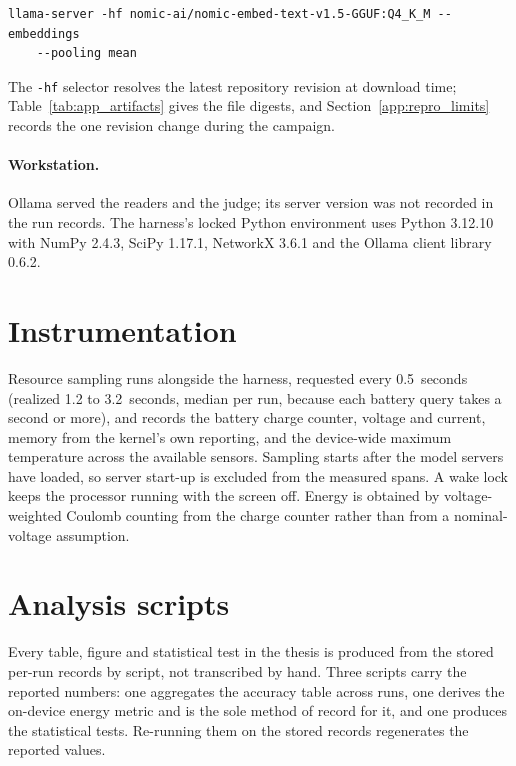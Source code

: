\begin{small}
\begin{verbatim}
llama-server -hf nomic-ai/nomic-embed-text-v1.5-GGUF:Q4_K_M --embeddings
    --pooling mean
\end{verbatim}
\end{small}

The \texttt{-hf} selector resolves the latest repository revision at download time;
Table~\ref{tab:app_artifacts} gives the file digests, and Section~\ref{app:repro_limits} records the
one revision change during the campaign.

\paragraph{Workstation.} Ollama served the readers and the judge; its server version was not
recorded in the run records. The harness's locked Python environment uses Python 3.12.10 with
NumPy 2.4.3, SciPy 1.17.1, NetworkX 3.6.1 and the Ollama client library 0.6.2.

\section{Instrumentation}
\label{app:repro_instrumentation}

Resource sampling runs alongside the harness, requested every 0.5~seconds (realized 1.2 to
3.2~seconds, median per run, because each battery query takes a second or more), and records the battery
charge counter, voltage and current, memory from the kernel's own reporting, and the
device-wide maximum temperature across the available sensors. Sampling starts after the model
servers have loaded, so server start-up is excluded from the measured spans. A wake lock keeps
the processor running with the screen off. Energy is obtained by voltage-weighted Coulomb
counting from the charge counter rather than from a nominal-voltage assumption.

\section{Analysis scripts}
\label{app:repro_scripts}

Every table, figure and statistical test in the thesis is produced from the stored per-run
records by script, not transcribed by hand. Three scripts carry the reported numbers: one
aggregates the accuracy table across runs, one derives the on-device energy metric and is the
sole method of record for it, and one produces the statistical tests. Re-running them on the
stored records regenerates the reported values.

